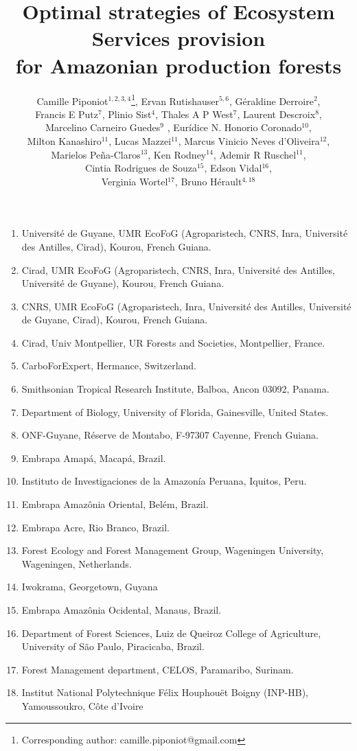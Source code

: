 \documentclass[12pt]{article}
\title{Optimal strategies of Ecosystem Services provision \\for Amazonian production forests\\ }
\author{Camille Piponiot$^{1,2,3,4}$\footnote{Corresponding author: camille.piponiot@gmail.com}, Ervan Rutishauser$^{5,6}$, Géraldine Derroire$^{2}$, \\Francis E Putz$^{7}$, Plinio Sist$^{4}$, Thales A P West$^{7}$, Laurent Descroix$^{8}$,\\ Marcelino Carneiro Guedes$^{9}$ , Eur\'idice N. Honorio Coronado$^{10}$, \\Milton Kanashiro$^{11}$, Lucas Mazzei$^{11}$, Marcus Vinicio Neves d’Oliveira$^{12}$,\\ Marielos Peña-Claros$^{13}$, Ken Rodney$^{14}$, Ademir R Ruschel$^{11}$,\\ Cintia Rodrigues de Souza$^{15}$, Edson Vidal$^{16}$, \\Verginia Wortel$^{17}$, Bruno Hérault$^{4,18}$}
\date{}
\begin{document}
\maketitle 

\begin{enumerate}
\item  Université  de  Guyane,  UMR  EcoFoG  (Agroparistech,  CNRS,  Inra,  Université  des  Antilles,  Cirad), Kourou, French Guiana.
\item Cirad,  UMR  EcoFoG  (Agroparistech,  CNRS,  Inra,  Université  des  Antilles,  Université  de  Guyane), Kourou, French Guiana.
\item CNRS,  UMR  EcoFoG  (Agroparistech,  Inra,  Université des  Antilles,  Université  de  Guyane,  Cirad), Kourou, French Guiana.
\item Cirad, Univ Montpellier, UR Forests and Societies, Montpellier, France.
\item CarboForExpert, Hermance, Switzerland.
\item Smithsonian Tropical Research Institute, Balboa, Ancon 03092, Panama.
\item Department of Biology, University of Florida, Gainesville, United States.
\item ONF-Guyane, Réserve de Montabo, F-97307 Cayenne, French Guiana.
\item Embrapa Amapá, Macapá, Brazil. 
\item Instituto de Investigaciones de la Amazonía Peruana, Iquitos, Peru.
\item Embrapa Amazônia Oriental, Belém, Brazil.
\item Embrapa Acre, Rio Branco, Brazil.
\item Forest Ecology and Forest Management Group, Wageningen University, Wageningen, Netherlands.
\item Iwokrama, Georgetown, Guyana
\item Embrapa Amazônia Ocidental, Manaus, Brazil.
\item Department of Forest Sciences, Luiz de Queiroz College of Agriculture, University of São Paulo, Piracicaba, Brazil.
\item Forest Management department, CELOS, Paramaribo, Surinam.
\item Institut National Polytechnique Félix Houphouët Boigny (INP-HB), Yamoussoukro, Côte d’Ivoire

\end{enumerate}
\end{document}
